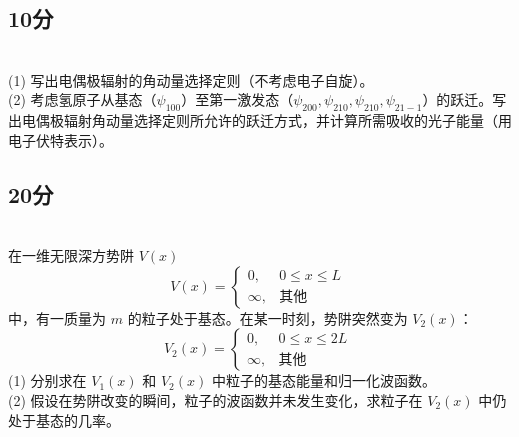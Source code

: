 \subsection{10分}\\
(1) 写出电偶极辐射的角动量选择定则（不考虑电子自旋）。\\
(2) 考虑氢原子从基态（$\psi_{100}$）至第一激发态（$\psi_{200}, \psi_{210},\psi_{210}, \psi_{21-1}$）的跃迁。写出电偶极辐射角动量选择定则所允许的跃迁方式，并计算所需吸收的光子能量（用电子伏特表示）。
\subsection{20分}\\
在一维无限深方势阱 $V(x)$ 
\[
V(x) = 
\begin{cases}
0, & 0 \leq x \leq L \\
\infty, & \text{其他}
\end{cases}~
\]
中，有一质量为 $m$ 的粒子处于基态。在某一时刻，势阱突然变为 $V_2(x)$：
\[
V_2(x) = 
\begin{cases}
0, & 0 \leq x \leq 2L \\
\infty, & \text{其他}
\end{cases}~
\]
(1) 分别求在 $V_1(x)$ 和 $V_2(x)$ 中粒子的基态能量和归一化波函数。\\
(2) 假设在势阱改变的瞬间，粒子的波函数并未发生变化，求粒子在 $V_2(x)$ 中仍处于基态的几率。
